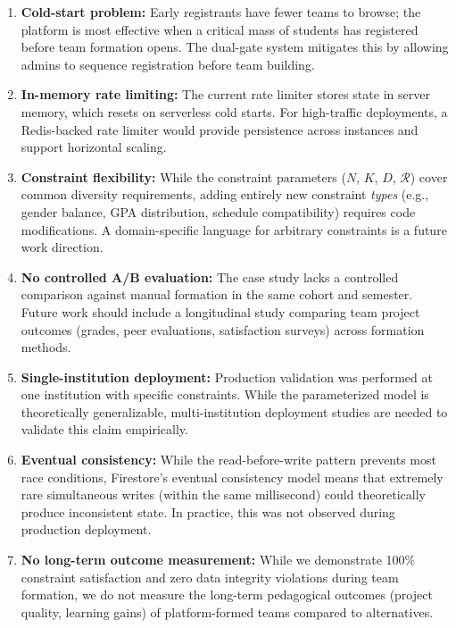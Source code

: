 \documentclass[conference]{IEEEtran}
\begin{document}
\begin{enumerate}[noitemsep,topsep=3pt]
    \item \textbf{Cold-start problem:} Early registrants have fewer teams to browse; the platform is most effective when a critical mass of students has registered before team formation opens. The dual-gate system mitigates this by allowing admins to sequence registration before team building.

    \item \textbf{In-memory rate limiting:} The current rate limiter stores state in server memory, which resets on serverless cold starts. For high-traffic deployments, a Redis-backed rate limiter would provide persistence across instances and support horizontal scaling.

    \item \textbf{Constraint flexibility:} While the constraint parameters ($N$, $K$, $D$, $\mathcal{R}$) cover common diversity requirements, adding entirely new constraint \textit{types} (e.g., gender balance, GPA distribution, schedule compatibility) requires code modifications. A domain-specific language for arbitrary constraints is a future work direction.

    \item \textbf{No controlled A/B evaluation:} The case study lacks a controlled comparison against manual formation in the same cohort and semester. Future work should include a longitudinal study comparing team project outcomes (grades, peer evaluations, satisfaction surveys) across formation methods.

    \item \textbf{Single-institution deployment:} Production validation was performed at one institution with specific constraints. While the parameterized model is theoretically generalizable, multi-institution deployment studies are needed to validate this claim empirically.

    \item \textbf{Eventual consistency:} While the read-before-write pattern prevents most race conditions, Firestore's eventual consistency model means that extremely rare simultaneous writes (within the same millisecond) could theoretically produce inconsistent state. In practice, this was not observed during production deployment.

    \item \textbf{No long-term outcome measurement:} While we demonstrate 100\% constraint satisfaction and zero data integrity violations during team formation, we do not measure the long-term pedagogical outcomes (project quality, learning gains) of platform-formed teams compared to alternatives.
\end{enumerate}
\end{document}
